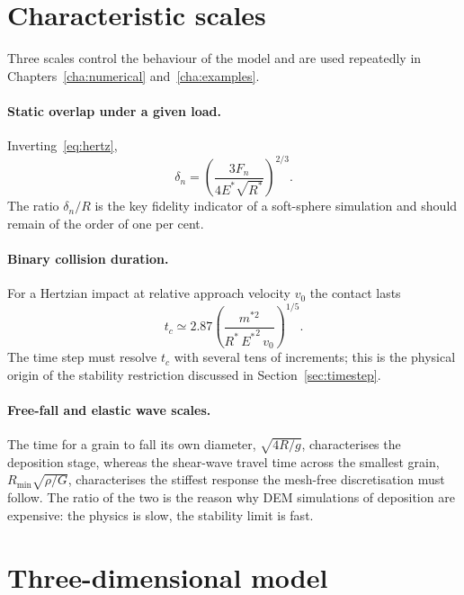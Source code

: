 \section{Characteristic scales}
\label{sec:scales}

Three scales control the behaviour of the model and are used repeatedly in
Chapters~\ref{cha:numerical} and~\ref{cha:examples}.

\paragraph{Static overlap under a given load.}  Inverting~\eqref{eq:hertz},
\begin{equation}
  \delta_{n}
  = \left(\frac{3F_{n}}{4E^{*}\sqrt{R^{*}}}\right)^{2/3} .
  \label{eq:delta-static}
\end{equation}
The ratio $\delta_{n}/R$ is the key fidelity indicator of a soft-sphere
simulation and should remain of the order of one per cent.

\paragraph{Binary collision duration.}  For a Hertzian impact at relative
approach velocity $v_{0}$ the contact lasts~\cite{johnson1985}
\begin{equation}
  t_{c} \simeq 2.87
  \left(\frac{m^{*2}}{R^{*}\,{E^{*}}^{2}\,v_{0}}\right)^{1/5} .
  \label{eq:tc}
\end{equation}
The time step must resolve $t_{c}$ with several tens of increments; this is the
physical origin of the stability restriction discussed in
Section~\ref{sec:timestep}.

\paragraph{Free-fall and elastic wave scales.}  The time for a grain to fall its
own diameter, $\sqrt{4R/g}$, characterises the deposition stage, whereas the
shear-wave travel time across the smallest grain, $R_{\min}\sqrt{\rho/G}$,
characterises the stiffest response the mesh-free discretisation must follow.
The ratio of the two is the reason why DEM simulations of deposition are
expensive: the physics is slow, the stability limit is fast.

\section{Three-dimensional model}
\label{sec:3d}

